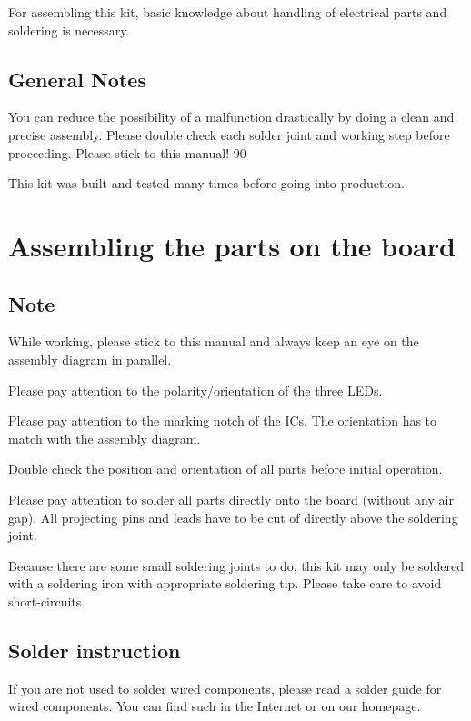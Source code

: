 \documentclass[fleqn,10pt]{SelfArx} %
\begin{document}
For assembling this kit, basic knowledge about handling of electrical parts and soldering is necessary.

 \subsection*{General Notes}

You can reduce the possibility of a malfunction drastically by doing a clean and precise assembly. Please double check each solder joint and working step before proceeding. Please stick to this manual!
90%

This kit was built and tested many times before going into production.


\section{Assembling the parts on the board}

 \subsection*{Note}

While working, please stick to this manual and always keep an eye on the assembly diagram in parallel.

Please pay attention to the polarity/orientation of the three LEDs.

Please pay attention to the marking notch of the ICs. The orientation has to match with the assembly diagram.

Double check the position and orientation of all parts before initial operation.

Please pay attention to solder all parts directly onto the board (without any air gap). All projecting pins and leads have to be cut of directly above the soldering joint.

Because there are some small soldering joints to do, this kit may only be soldered with a soldering iron with appropriate soldering tip. Please take care to avoid short-circuits.

 \subsection*{Solder instruction}

If you are not used to solder wired components, please read a solder guide for wired components. You can find such in the Internet or on our homepage.
\end{document}

